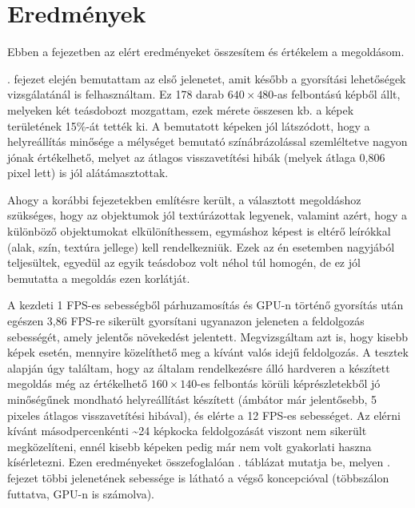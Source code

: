 \chapter{Eredmények}

Ebben a fejezetben az elért eredményeket összesítem és értékelem a megoldásom.

. fejezet elején bemutattam az első jelenetet, amit később a gyorsítási lehetőségek vizsgálatánál is felhasználtam. Ez 178 darab $640\times 480$-as felbontású képből állt, melyeken két teásdobozt mozgattam, ezek mérete összesen kb. a képek területének 15\%-át tették ki. A bemutatott képeken jól látszódott, hogy a helyreállítás minősége a mélységet bemutató színábrázolással szemléltetve nagyon jónak értékelhető, melyet az átlagos visszavetítési hibák (melyek átlaga 0,806 pixel lett) is jól alátámasztottak.

Ahogy a korábbi fejezetekben említésre került, a választott megoldáshoz szükséges, hogy az objektumok jól textúrázottak legyenek, valamint azért, hogy a különböző objektumokat elkülöníthessem, egymáshoz képest is eltérő leírókkal (alak, szín, textúra jellege) kell rendelkezniük. Ezek az én esetemben nagyjából teljesültek, egyedül az egyik teásdoboz volt néhol túl homogén, de ez jól bemutatta a megoldás ezen korlátját.

A kezdeti 1 FPS-es sebességből párhuzamosítás és GPU-n történő gyorsítás után egészen 
3,86 FPS-re sikerült gyorsítani ugyanazon jeleneten a feldolgozás sebességét, amely jelentős növekedést jelentett. Megvizsgáltam azt is, hogy kisebb képek esetén, mennyire közelíthető meg a kívánt valós idejű feldolgozás. A tesztek alapján úgy találtam, hogy az általam rendelkezésre álló hardveren a készített megoldás még az értékelhető $160\times 140$-es felbontás körüli képrészletekből jó minőségűnek mondható helyreállítást készített (ámbátor már jelentősebb, 5 pixeles átlagos visszavetítési hibával), és elérte a 12 FPS-es sebességet. Az elérni kívánt másodpercenkénti \textasciitilde 24 képkocka feldolgozását viszont nem sikerült megközelíteni, ennél kisebb képeken pedig már nem volt gyakorlati haszna kísérletezni. Ezen eredményeket összefoglalóan . táblázat mutatja be, melyen . fejezet többi jelenetének sebessége is látható a végső koncepcióval (többszálon futtatva, GPU-n is számolva).

